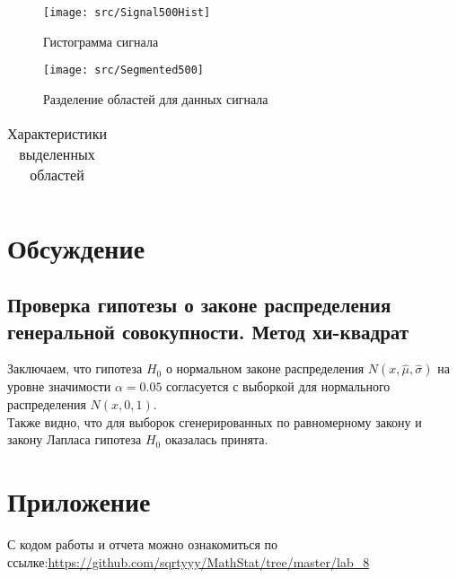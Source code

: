 \documentclass[a4paper]{article}
\begin{document}
		\begin{figure}[H]
		\centering
		\texttt{[image: src/Signal500Hist]}
		\caption{Гистограмма сигнала}
		\label{fig:signalHist}
	\end{figure}

	\begin{figure}[H]
		\centering
		\texttt{[image: src/Segmented500]}
		\caption{Разделение областей для данных сигнала}
		\label{fig:signalSegmented}
	\end{figure}
	\begin{table}[H]
    \centering
    \begin{tabular}{|c|c|c|c|}
    	\hline
        
    \end{tabular}
    \caption{Характеристики выделенных областей}
    \label{tab:FisherTab}
\end{table}
\section{Обсуждение}
\subsection{Проверка гипотезы о законе распределения генеральной совокупности. Метод хи-квадрат}

\noindent Заключаем, что гипотеза $H_{0}$ о нормальном законе распределения $N(x,\hat{\mu}, \hat{\sigma})$ на уровне значимости $\alpha = 0.05$ согласуется с выборкой для нормального распределения $N(x, 0, 1)$.
\\
Также видно, что для выборок сгенерированных по равномерному закону и закону Лапласа гипотеза $H_{0}$ оказалась принята.

\section{Приложение}
    С кодом работы и отчета можно ознакомиться по ссылке:\;\url{https://github.com/sqrtyyy/MathStat/tree/master/lab_8}
\end{document}
